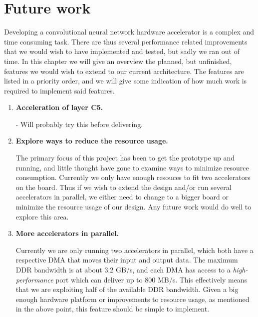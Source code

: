 \chapter{Future work} \label{chap_future_work}

Developing a convolutional neural network hardware accelerator is a complex and time consuming task. There are thus several performance related improvements that we would wish to have implemented and tested, but sadly we ran out of time. In this chapter we will give an overview the planned, but unfinished, features we would wish to extend to our current architecture. The features are listed in a priority order, and we will give some indication of how much work is required to implement said features.


\begin{enumerate}                           


	\item \textbf{Acceleration of layer C5.}
	
-	Will probably try this before delivering. 
	
	\item \textbf{Explore ways to reduce the resource usage.}
	
	The primary focus of this project has been to get the prototype up and running, and little thought have gone to examine ways to minimize resource consumption. Currently we only have enough resouces to fit two accelerators on the board. Thus if we wish to extend the design and/or run several accelerators in parallel, we either need to change to a bigger board or minimize the resource usage of our design. Any future work would do well to explore this area. 
	

	
	\item \textbf{More accelerators in parallel.}
	
	Currently we are only running two accelerators in parallel, which both have a respective DMA that moves their input and output data. The maximum DDR bandwidth is at about 3.2 GB/s, and each DMA has access to a \textit{high-performance} port which can  deliver up to 800 MB/s. This effectively means that we are exploiting half of the available DDR bandwidth. Given a big enough hardware platform or improvements to resource usage, as mentioned in the above point, this feature should be simple to implement. 
	

\end{enumerate}

